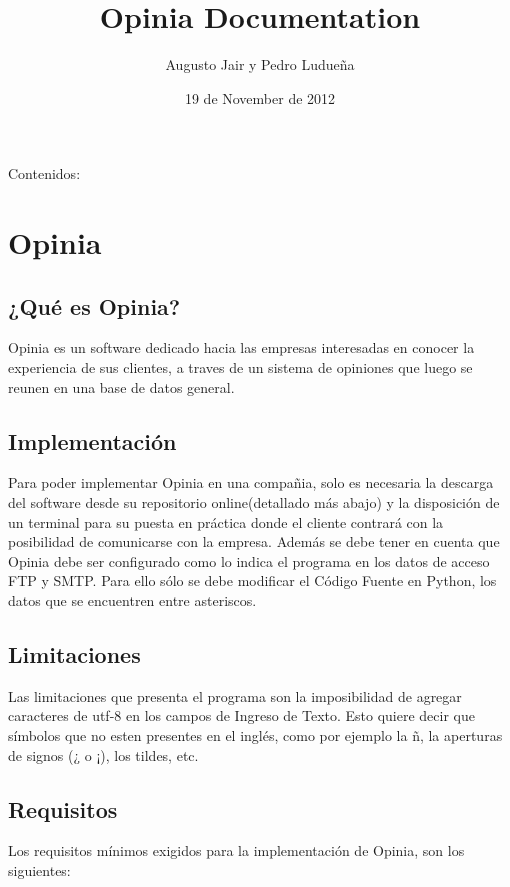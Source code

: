 \documentclass[letterpaper,10pt,spanish]{sphinxmanual}
\title{Opinia Documentation}
\date{19 de November de 2012}
\author{Augusto Jair y Pedro Ludueña}
\begin{document}
\maketitle
\tableofcontents
{}\label{index::doc}


Contenidos:


\chapter{Opinia}
\label{Opinia:opinia}\label{Opinia:bienvenido-a-la-documentacion-de-opinia}\label{Opinia::doc}

\section{¿Qué es Opinia?}
\label{Opinia:que-es-opinia}
Opinia es un software dedicado hacia las empresas interesadas en conocer la experiencia de sus clientes, a traves de un sistema de opiniones que luego se reunen en una base de datos general.


\section{Implementación}
\label{Opinia:implementacion}
Para poder implementar Opinia en una compañia, solo es necesaria la descarga del software desde su repositorio online(detallado más abajo) y la disposición de un terminal para su puesta en práctica donde el cliente contrará con la posibilidad de comunicarse con la empresa.
Además se debe tener en cuenta que Opinia debe ser configurado como lo indica el programa en los datos de acceso FTP y SMTP. Para ello sólo se debe modificar el Código Fuente en Python, los datos que se encuentren entre asteriscos.


\section{Limitaciones}
\label{Opinia:limitaciones}
Las limitaciones que presenta el programa son la imposibilidad de agregar caracteres de utf-8 en los campos de Ingreso de Texto. Esto quiere decir que símbolos que no esten presentes en el inglés, como por ejemplo la ñ, la aperturas de signos (¿ o ¡), los tildes, etc.


\section{Requisitos}
\label{Opinia:requisitos}
Los requisitos mínimos exigidos para la implementación de Opinia, son los siguientes:
\end{document}
